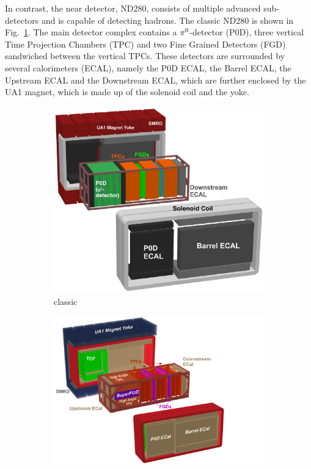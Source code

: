   In contrast, the near detector, ND280, consists of multiple advanced sub-detectors and is capable of detecting hadrons.
  The classic ND280 is shown in Fig.~\ref{subfig:nd280-classic}.
  The main detector complex contains a $\pi^0$-detector (P0D), three vertical Time Projection Chambers (TPC) and two Fine Grained Detectors (FGD) sandwiched between the vertical TPCs.
  These detectors are surrounded by several calorimeters (ECAL), namely the P0D ECAL, the Barrel ECAL, the Upstream ECAL and the Downstream ECAL, which are further enclosed by the UA1 magnet, which is made up of the solenoid coil and the yoke. 
  \begin{figure}
        \centering
        \begin{subfigure}[b]{\dbfigwid\textwidth}
            \centering
            \includegraphics[width=\textwidth]{figures/t2k/ND280-classic.eps}
            \caption{classic}
            \label{subfig:nd280-classic}
        \end{subfigure}
        \begin{subfigure}[b]{\dbfigwid\textwidth}
            \centering
            \includegraphics[width=\textwidth]{figures/t2k/ND280-up.png}

\end{subfigure}
\end{figure}
